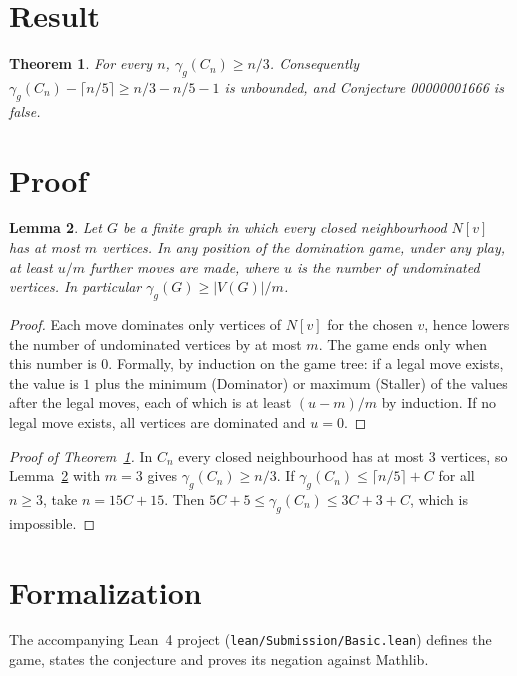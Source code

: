 \documentclass[11pt]{article}
\theoremstyle{plain}
\newtheorem{theorem}{Theorem}
\newtheorem{lemma}[theorem]{Lemma}
\theoremstyle{definition}
\theoremstyle{remark}
\begin{document}
\section{Result}

\begin{theorem}\label{thm:main}
For every $n$, $\gamma_g(C_n)\ge n/3$. Consequently
$\gamma_g(C_n)-\lceil n/5\rceil\ge n/3-n/5-1$ is unbounded, and Conjecture
00000001666 is false.
\end{theorem}

\section{Proof}

\begin{lemma}\label{lem:game}
Let $G$ be a finite graph in which every closed neighbourhood $N[v]$ has at most
$m$ vertices. In any position of the domination game, under any play, at least
$u/m$ further moves are made, where $u$ is the number of undominated
vertices. In particular $\gamma_g(G)\ge |V(G)|/m$.
\end{lemma}

\begin{proof}
Each move dominates only vertices of $N[v]$ for the chosen $v$, hence lowers the
number of undominated vertices by at most $m$. The game ends only when this
number is $0$. Formally, by induction on the game tree: if a legal move exists,
the value is $1$ plus the minimum (Dominator) or maximum (Staller) of the values
after the legal moves, each of which is at least $(u-m)/m$ by induction. If no
legal move exists, all vertices are dominated and $u=0$.
\end{proof}

\begin{proof}[Proof of Theorem~\ref{thm:main}]
In $C_n$ every closed neighbourhood has at most $3$ vertices, so
Lemma~\ref{lem:game} with $m=3$ gives $\gamma_g(C_n)\ge n/3$. If
$\gamma_g(C_n)\le\lceil n/5\rceil+C$ for all $n\ge3$, take $n=15C+15$. Then
$5C+5\le\gamma_g(C_n)\le 3C+3+C$, which is impossible.
\end{proof}

\section{Formalization}

The accompanying Lean~4 project (\texttt{lean/Submission/Basic.lean}) defines
the game, states the conjecture and proves its negation against Mathlib.
\end{document}
